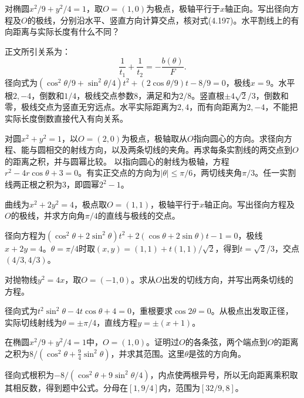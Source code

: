 对椭圆\(x^2/9+y^2/4=1\)，取\(O=(1,0)\)为极点，极轴平行于\(x\)轴正向。写出径向方程及\(O\)的极线，分别沿水平、竖直方向计算交点，核对式\textup{(4.197)}。水平割线上的有向距离与实际长度有什么不同？

\par\smallskip\noindent 正文所引关系为：
\begin{equation*}
\frac1{t_1}+\frac1{t_2}=-\frac{b(\theta)}F.
\end{equation*}
\solutionanswer
径向式为\((\cos^2\theta/9+\sin^2\theta/4)t^2+(2\cos\theta/9)t-8/9=0\)，极线\(x=9\)。水平根\(2,-4\)，倒数和\(1/4\)，极线交点参数\(8\)，满足和为\(2/8\)。竖直根\(\pm4\sqrt2/3\)，倒数和零，极线交点为竖直无穷远点。水平实际距离为\(2,4\)，而有向距离为\(2,-4\)，不能把实际长度倒数直接代入有向关系。


对圆\(x^2+y^2=1\)，以\(O=(2,0)\)为极点，极轴取从\(O\)指向圆心的方向。求径向方程、能与圆相交的射线方向，以及两条切线的夹角。再求每条实割线的两交点到\(O\)的距离之积，并与圆幂比较。
\solutionanswer
以指向圆心的射线为极轴，方程\(r^2-4r\cos\theta+3=0\)。有实正交点的方向为\(|\theta|\le\pi/6\)，两切线夹角\(\pi/3\)。任一实割线两正根之积为\(3\)，即圆幂\(2^2-1\)。


曲线为\(x^2+2y^2=4\)，极点取\(O=(1,1)\)，极轴平行于\(x\)轴正向。写出径向方程及\(O\)的极线，并求方向角\(\pi/4\)的直线与极线的交点。
\par
\solutionanswer
径向方程为\((\cos^2\theta+2\sin^2\theta)t^2+2(\cos\theta+2\sin\theta)t-1=0\)，极线\(x+2y=4\)。\(\theta=\pi/4\)时取\((x,y)=(1,1)+t(1,1)/\sqrt2\)，得到\(t=\sqrt2/3\)，交点\((4/3,4/3)\)。


对抛物线\(y^2=4x\)，取\(O=(-1,0)\)。求从\(O\)出发的切线方向，并写出两条切线的方程。
\par
\solutionanswer
径向式为\(t^2\sin^2\theta-4t\cos\theta+4=0\)，重根要求\(\cos2\theta=0\)。从极点出发取正径，实际切线射线为\(\theta=\pm\pi/4\)，直线方程\(y=\pm(x+1)\)。


在椭圆\(x^2/9+y^2/4=1\)中，\(O=(1,0)\)。证明过\(O\)的各条弦，两个端点到\(O\)的距离之积为\(8/(\cos^2\theta+\tfrac94\sin^2\theta)\)，并求其范围。这里\(\theta\)是弦的方向角。
\par
\solutionanswer
径向式根积为\(-8/(\cos^2\theta+9\sin^2\theta/4)\)，内点使两根异号，所以无向距离乘积取其相反数，得到题中公式。分母在\([1,9/4]\)内，范围为\([32/9,8]\)。


